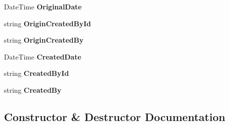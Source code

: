 \begin{DoxyCompactItemize}
\item 
Date\+Time {\bfseries Original\+Date}\hypertarget{class_products_1_1_model_1_1_entities_1_1_history_item_a5de5c715d9052a9925a39f1abdcf4776}{}\label{class_products_1_1_model_1_1_entities_1_1_history_item_a5de5c715d9052a9925a39f1abdcf4776}

\item 
string {\bfseries Origin\+Created\+By\+Id}\hypertarget{class_products_1_1_model_1_1_entities_1_1_history_item_ab45ecbd78998ef10cfb690d3ee984a10}{}\label{class_products_1_1_model_1_1_entities_1_1_history_item_ab45ecbd78998ef10cfb690d3ee984a10}

\item 
string {\bfseries Origin\+Created\+By}\hypertarget{class_products_1_1_model_1_1_entities_1_1_history_item_adea6b84bbacd86873e6450df7b057752}{}\label{class_products_1_1_model_1_1_entities_1_1_history_item_adea6b84bbacd86873e6450df7b057752}

\item 
Date\+Time {\bfseries Created\+Date}\hypertarget{class_products_1_1_model_1_1_entities_1_1_history_item_aaa13366f497234091b99a4d478ce72d7}{}\label{class_products_1_1_model_1_1_entities_1_1_history_item_aaa13366f497234091b99a4d478ce72d7}

\item 
string {\bfseries Created\+By\+Id}\hypertarget{class_products_1_1_model_1_1_entities_1_1_history_item_aa41a7043aa1338f97febc0700d9f21c0}{}\label{class_products_1_1_model_1_1_entities_1_1_history_item_aa41a7043aa1338f97febc0700d9f21c0}

\item 
string {\bfseries Created\+By}\hypertarget{class_products_1_1_model_1_1_entities_1_1_history_item_a81c5114d0999e2001c929f4b43efc04e}{}\label{class_products_1_1_model_1_1_entities_1_1_history_item_a81c5114d0999e2001c929f4b43efc04e}

\end{DoxyCompactItemize}


\subsection{Constructor \& Destructor Documentation}
